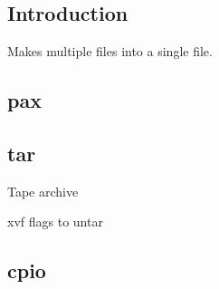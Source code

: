 
\subsection{Introduction}

Makes multiple files into a single file.


\subsection{pax}

\subsection{tar}

Tape archive

xvf flags to untar

\subsection{cpio}

